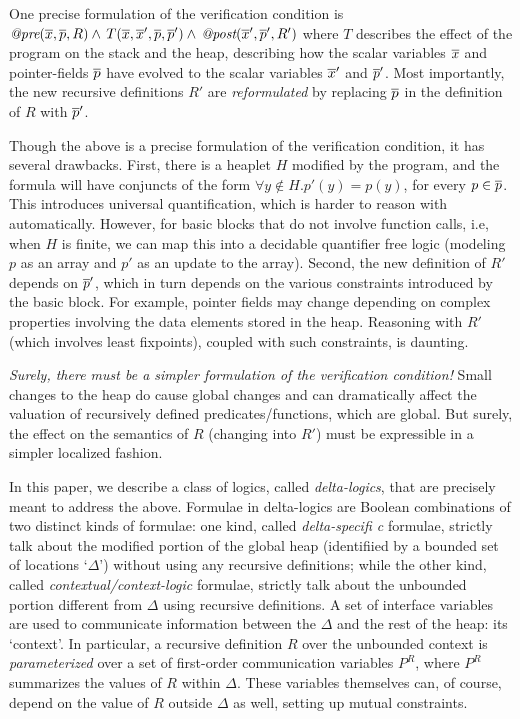 One precise formulation of the verification condition is 
$\textit{@pre}(\overline{x}, \overline{p}, R) \wedge\, T(\overline{x}, \overline{x}', \overline{p}, \overline{p}') \wedge\, \textit{@post}(\overline{x}', \overline{p}', R')$
where $T$ describes the effect of the program on the stack and the heap, describing how the scalar variables $\overline{x}$ and
 pointer-fields $\overline{p}$ have evolved to the scalar variables $\overline{x}'$ and $\overline{p}'$.
Most importantly, the new recursive definitions $R'$ are \emph{reformulated} by replacing $\overline{p}$ in the definition of $R$
with $\overline{p}'$. 

Though the above is a precise formulation of the verification condition, it has several drawbacks. First, there is a heaplet $H$
modified by the program, and the formula will have conjuncts of the form $\forall y \not \in H. p'(y)=p(y)$, for every $p \in \overline{p}$.
 This introduces
universal quantification, which is harder to reason with automatically. However, for basic blocks that do not involve
function calls, i.e, when $H$ is finite, we can map this into a decidable quantifier free logic (modeling $p$ as an array
and $p'$ as an update to the array).
Second, the new definition of $R'$ depends on $\overline{p}'$, which in turn depends on the various constraints introduced by the basic
block. For example, pointer fields may change depending on complex properties involving the data elements stored in the heap.
Reasoning with $R'$ (which involves least fixpoints), coupled with such constraints, is daunting.

\emph{Surely, there must be a simpler formulation of the verification condition!} Small changes to the heap do cause global changes and
can dramatically affect the valuation of recursively defined predicates/functions, which are global.
But surely, the effect on the semantics of $R$ (changing into $R'$) must be expressible in a simpler localized fashion.

In this paper, we describe a class of logics, called \emph{delta-logics}, that are precisely meant to address the above.
Formulae in delta-logics are Boolean combinations of two distinct kinds of formulae: one kind, called \emph{delta-specifi
c} formulae, strictly talk about the modified portion of the global heap (identifiied by a bounded set of locations `$\Delta$') without using
any recursive definitions; while the other 
kind, called \emph{contextual/context-logic} formulae, strictly talk about the unbounded portion different from $\Delta$ using recursive definitions.
A set of interface variables are used to communicate information between the $\Delta$ and the rest of the heap: its `context'. In particular, a recursive definition $R$ over the unbounded context is \emph{parameterized}
over a set of first-order communication variables $P^R$, where $P^R$ summarizes the values of $R$ within $\Delta$.
These variables themselves can, of course, depend on the value of $R$ outside $\Delta$ as well, setting up mutual
constraints. 

